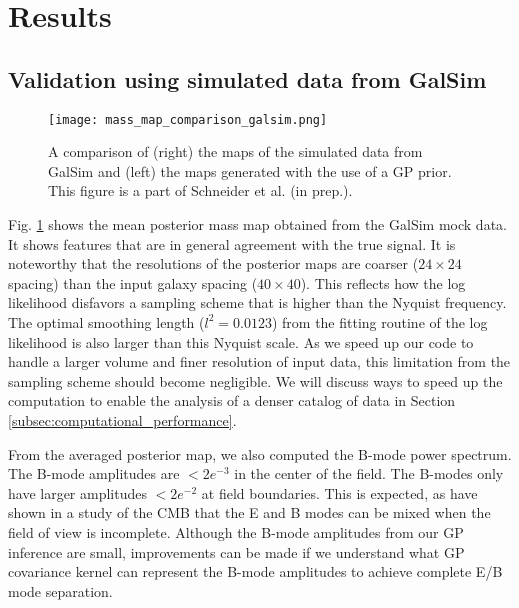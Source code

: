 \section{Results}

\subsection{Validation using simulated data from {\sc GalSim}}
\begin{figure}[!ht]
	\centering
	\texttt{[image: mass\_map\_comparison\_galsim.png]}
	\caption{A comparison of (right) the maps of the simulated data from {\sc GalSim}  and
	(left) the maps generated with the use of a GP prior. 
	This figure is a part of Schneider et al. (in prep.). \label{fig:Galsim_massmap}
}
\end{figure}
Fig. \ref{fig:Galsim_massmap} shows the mean posterior mass map obtained from
the {\sc GalSim} mock data. 
It shows features that are in general agreement with the true signal. 
It is noteworthy that the resolutions of the posterior maps are coarser ($24 \times 24$
spacing) than the input galaxy
spacing ($40 \times 40$). This reflects how the log likelihood
disfavors a sampling
scheme that is higher than the Nyquist frequency. The optimal smoothing length
($l^2 = 0.0123$) from the fitting routine of the log likelihood is also
larger than this Nyquist scale. As we speed up our code to handle a larger
volume and finer
resolution of input data, this limitation from the sampling scheme should
become negligible. We will discuss ways to speed up the computation to enable
the analysis of a denser catalog of data in Section
\ref{subsec:computational_performance}. 

From the averaged posterior map, we also computed the B-mode power spectrum.
The B-mode amplitudes are $< 2e^{-3}$ in the center of the field. 
The B-modes only have larger amplitudes $< 2e^{-2}$ at field boundaries.  
This is expected, as \cite{Bunn2003} have shown in a study of the CMB that 
the E and B modes can be mixed when the field of view is incomplete.
Although the B-mode amplitudes from our GP inference are small, 
improvements can be made 
if we understand what GP covariance kernel can represent the B-mode amplitudes to achieve complete E/B mode
separation.

